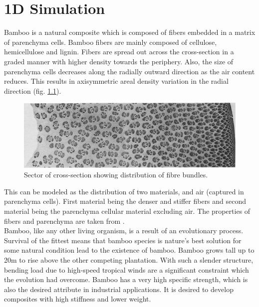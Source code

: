 \documentclass[openright,twoside]{iitkthesis}
\begin{document}
\chapter{1D Simulation}
Bamboo is a natural composite which is composed of fibers embedded in a matrix of parenchyma cells. Bamboo fibers are mainly composed of cellulose, hemicellulose and lignin.\cite{mwaikambo2006review} Fibers are spread out across the cross-section in a graded manner with higher density towards the periphery. Also, the size of parenchyma cells decreases along the radially outward direction as the air content reduces. This results in axisymmetric areal density variation in the radial direction (fig. \ref{fig:fibrebundle}).
\begin{figure}[H]
\begin{center}
\includegraphics[scale=.35]{./Plots/normal/radialfibers.png}
\caption{Sector of cross-section showing distribution of fibre bundles. \cite{grosser1971anatomy}}
\label{fig:fibrebundle}
\end{center}
\end{figure}
This can be modeled as the distribution of two materials, and air (captured in parenchyma cells). First material being the denser and stiffer fibers and second material being the parenchyma cellular material excluding air. The properties of fibers and parenchyma are taken from \cite{mannan2018stiffness}\cite{mwaikambo2006review}. \\
Bamboo, like any other living organism, is a result of an evolutionary process. Survival of the fittest means that bamboo species is nature's best solution for some natural condition lead to the existence of bamboo. Bamboo grows tall up to 20m to rise above the other competing plantation. With such a slender structure, bending load due to high-speed tropical winds are a significant constraint which the evolution had overcome. Bamboo has a very high specific strength, which is also the desired attribute in industrial applications. It is desired to develop composites with high stiffness and lower weight.\\ 
\end{document}
